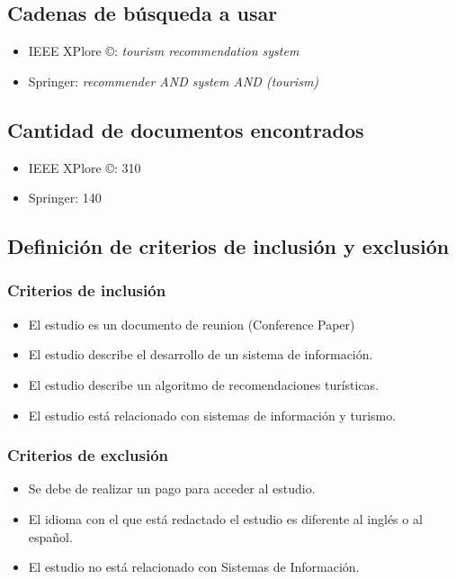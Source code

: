 \documentclass{report}
\begin{document}
\subsection{Cadenas de búsqueda a usar}

\begin{itemize}
    \item{IEEE XPlore \copyright{}: \emph{tourism recommendation system}}
    \item{Springer: \emph{recommender AND system AND (tourism)}}
\end{itemize}

\subsection{Cantidad de documentos encontrados}

\begin{itemize}
    \item{IEEE XPlore \copyright{}: 310}
    \item{Springer: 140}
\end{itemize}

\subsection{Definición de criterios de inclusión y exclusión}

\subsubsection{Criterios de inclusión}

\begin{itemize}
    \item{El estudio es un documento de reunion (Conference Paper)}
    \item{El estudio describe el desarrollo de un sistema de información.}
    \item{El estudio describe un algoritmo de recomendaciones turísticas.}
    \item{El estudio está relacionado con sistemas de información y turismo.}
\end{itemize}

\subsubsection{Criterios de exclusión}

\begin{itemize}
    \item{Se debe de realizar un pago para acceder al estudio.}
    \item{El idioma con el que está redactado el estudio es diferente al inglés
        o al español.}
    \item{El estudio no está relacionado con Sistemas de Información.}
\end{itemize}
\end{document}
